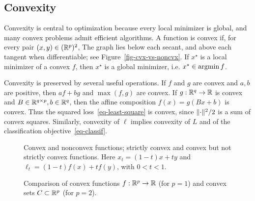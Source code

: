 \subsection{Convexity}

Convexity is central to optimization because every local minimizer is global, and many convex problems admit efficient algorithms. A function is convex if, for every pair $(x,y) \in (\mathbb{R}^p)^2$,
The graph lies below each secant, and above each tangent when differentiable; see Figure~\ref{fig-cvx-vs-noncvx}.
%
If $x^\star$ is a local minimizer of a convex $f$, then $x^\star$ is a global minimizer, i.e. $x^\star \in \operatorname{argmin} f$.  


Convexity is preserved by several useful operations. If $f$ and $g$ are convex and $a, b$ are positive, then $a f + b g$ and $\max(f,g)$ are convex. If $g : \mathbb{R}^q \rightarrow \mathbb{R}$ is convex and $B \in \mathbb{R}^{q \times p}, b \in \mathbb{R}^q$, then the affine composition $f(x) = g(B x+b)$ is convex.
%
Thus the squared loss~\eqref{eq-least-square} is convex, since $\lVert\cdot\rVert^2/2$ is a sum of convex squares.
%
Similarly, convexity of $\ell$ implies convexity of $L$ and of the classification objective~\eqref{eq-classif}.

\begin{figure}[tbp]
\centering
{}\hfill
{}\hfill
{}\hfill
{}
\caption{Convex and nonconvex functions; strictly convex and convex but not strictly convex functions. Here $x_t=(1-t)x+ty$ and $\ell_t=(1-t)f(x)+tf(y)$, with $0<t<1$.}
\label{fig-cvx-vs-noncvx}
\label{fig-cvx-vs-noncvx-continued}
\end{figure}




\begin{figure}[tbp]
\centering
{}
\caption{Comparison of convex functions $f : \mathbb{R}^p \rightarrow \mathbb{R}$ (for $p=1$) and convex sets $C \subset \mathbb{R}^p$ (for $p=2$).}
\label{fig-cvx-set}
\end{figure}

